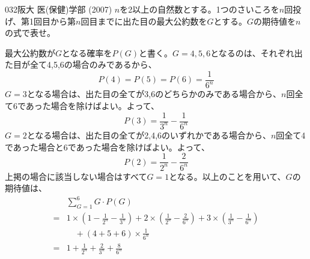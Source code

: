 \begin{prob}{032}{}{阪大 医(保健)学部 (2007)}
 $n$を2以上の自然数とする。1つのさいころを$n$回投げ、第1回目から第$n$回目までに出た目の最大公約数を$G$とする。$G$の期待値を$n$の式で表せ。
\end{prob}
最大公約数が$G$となる確率を$P(G)$と書く。$G=4,5,6$となるのは、それぞれ出た目が全て4,5,6の場合のみであるから、
\[ P(4)=P(5)=P(6)=\frac{1}{6^n} \]
$G=3$となる場合は、出た目の全てが3,6のどちらかのみである場合から、$n$回全て6であった場合を除けばよい。よって、
\[ P(3)=\frac{1}{3^n}-\frac{1}{6^n} \]
$G=2$となる場合は、出た目の全てが2,4,6のいずれかである場合から、$n$回全て4であった場合と6であった場合を除けばよい。よって、
\[ P(2)=\frac{1}{2^n}-\frac{2}{6^n} \]
上掲の場合に該当しない場合はすべて$G=1$となる。以上のことを用いて、$G$の期待値は、
\begin{align*}
 &\sum_{G=1}^6 G\cdot P(G)　\\
 =& 1\times \left(1-\frac{1}{2^n}-\frac{1}{3^n}\right)+2\times\left(\frac{1}{2^n}-\frac{2}{6^n}\right)+3\times\left(\frac{1}{3^n}-\frac{1}{6^n}\right) \\
 &\quad +(4+5+6)\times\frac{1}{6^n} \\
 =& 1+\frac{1}{2^n}+\frac{2}{3^n}+\frac{8}{6^n}
\end{align*}